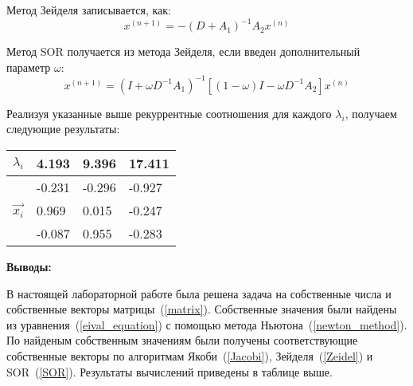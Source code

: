 Метод Зейделя записывается, как:
\begin{equation}\label{Zeidel}
    x^{(n+1)} = -(D + A_1)^{-1}A_2x^{(n)}
\end{equation}

Метод SOR получается из метода Зейделя, если введен дополнительный параметр $\omega$:
\begin{equation}\label{SOR}
    x^{(n+1)} = (I + \omega D^{-1}A_1)^{-1}[(1 - \omega)I - \omega D^{-1}A_2]x^{(n)}
\end{equation}

Реализуя указанные выше рекуррентные соотношения для каждого $\lambda_i$, получаем следующие результаты:
\begin{table}[hb]
\centering
\begin{tabular}{|l|l|l|l|} 
\hline
$\lambda_i$ & 4.193  & 9.396  & 17.411   \\ 
\hline
     & -0.231 & -0.296 & -0.927  \\
$\vec{x_i}$ & 0.969 & 0.015 & -0.247  \\
     & -0.087 & 0.955 & -0.283  \\
\hline
\end{tabular}\label{table}
\end{table}

\textbf{Выводы:}

В настоящей лабораторной работе была решена задача на собственные числа и собственные векторы матрицы~(\ref{matrix}). Собственные значения были найдены из уравнения~(\ref{eival_equation}) с помощью метода Ньютона~(\ref{newton_method}). По найденым собственным значениям были получены соответствующие собственные векторы по алгоритмам Якоби~(\ref{Jacobi}), Зейделя~(\ref{Zeidel}) и SOR~(\ref{SOR}). Результаты вычислений приведены в таблице выше.
